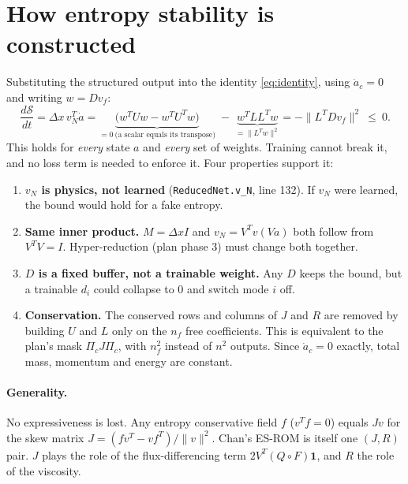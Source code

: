 \documentclass[11pt,a4paper]{article}
\newcommand{\code}[1]{\texttt{\small #1}}
\newcommand{\Sc}{\mathcal S}
\begin{document}
\section{How entropy stability is constructed}\label{sec:es}
Substituting the structured output into the identity \eqref{eq:identity}, using $\dot a_c=0$ and writing $w=Dv_f$:
\begin{equation}
\frac{d\Sc}{dt}=\Delta x\,v_N^T\dot a
= \underbrace{\big(w^TUw - w^TU^Tw\big)}_{=0\ \text{(a scalar equals its transpose)}} \;-\; \underbrace{w^TLL^Tw}_{=\|L^Tw\|^2}
= -\|L^TDv_f\|^2\ \le\ 0 .
\end{equation}
This holds for \emph{every} state $a$ and \emph{every} set of weights. Training cannot break it, and no loss term is needed to enforce it. Four properties support it:
\begin{enumerate}
\item \textbf{$v_N$ is physics, not learned} (\code{ReducedNet.v\_N}, line 132). If $v_N$ were learned, the bound would hold for a fake entropy.
\item \textbf{Same inner product.} $M=\Delta xI$ and $v_N=V^Tv(Va)$ both follow from $V^TV=I$. Hyper-reduction (plan phase 3) must change both together.
\item \textbf{$D$ is a fixed buffer, not a trainable weight.} Any $D$ keeps the bound, but a trainable $d_i$ could collapse to 0 and switch mode $i$ off.
\item \textbf{Conservation.} The conserved rows and columns of $J$ and $R$ are removed by building $U$ and $L$ only on the $n_f$ free coefficients. This is equivalent to the plan's mask $\Pi_cJ\Pi_c$, with $n_f^2$ instead of $n^2$ outputs. Since $\dot a_c=0$ exactly, total mass, momentum and energy are constant.
\end{enumerate}
\paragraph{Generality.} No expressiveness is lost. Any entropy conservative field $f$ ($v^Tf=0$) equals $Jv$ for the skew matrix $J=(fv^T-vf^T)/\|v\|^2$. Chan's ES-ROM is itself one $(J,R)$ pair. $J$ plays the role of the flux-differencing term $2V^T(Q\circ F)\mathbf 1$, and $R$ the role of the viscosity.
\end{document}
